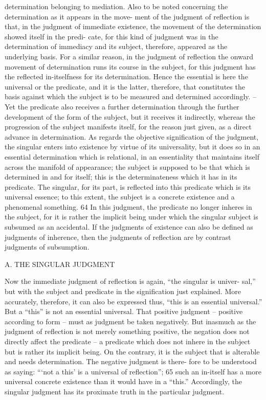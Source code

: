 determination belonging to mediation.
Also to be noted concerning the determination as it appears in the move-
ment of the judgment of reflection is that, in the judgment of immediate
existence, the movement of the determination showed itself in the predi-
cate, for this kind of judgment was in the determination of immediacy and
its subject, therefore, appeared as the underlying basis. For a similar reason,
in the judgment of reflection the onward movement of determination runs
its course in the subject, for this judgment has the reflected in-itselfness for
its determination. Hence the essential is here the universal or the predicate,
and it is the latter, therefore, that constitutes the basis against which the
subject is to be measured and determined accordingly. – Yet the predicate
also receives a further determination through the further development of
the form of the subject, but it receives it indirectly, whereas the progression
of the subject manifests itself, for the reason just given, as a direct advance
in determination.
As regards the objective signification of the judgment, the singular enters
into existence by virtue of its universality, but it does so in an essential
determination which is relational, in an essentiality that maintains itself
across the manifold of appearance; the subject is supposed to be that which
is determined in and for itself; this is the determinateness which it has in its
predicate. The singular, for its part, is reflected into this predicate which is
its universal essence; to this extent, the subject is a concrete existence and a
phenomenal something. 64 In this judgment, the predicate no longer inheres
in the subject, for it is rather the implicit being under which the singular
subject is subsumed as an accidental. If the judgments of existence can also
be defined as judgments of inherence, then the judgments of reflection are
by contrast judgments of subsumption.

A. THE SINGULAR JUDGMENT

Now the immediate judgment of reflection is again, “the singular is univer-
sal,” but with the subject and predicate in the signification just explained.
More accurately, therefore, it can also be expressed thus, “this is an essential
universal.”
But a “this” is not an essential universal. That positive judgment – positive
according to form – must as judgment be taken negatively. But inasmuch
as the judgment of reflection is not merely something positive, the negation
does not directly affect the predicate – a predicate which does not inhere in
the subject but is rather its implicit being. On the contrary, it is the subject
that is alterable and needs determination. The negative judgment is there-
fore to be understood as saying: “‘not a this' is a universal of reflection”; 65
such an in-itself has a more universal concrete existence than it would have
in a “this.” Accordingly, the singular judgment has its proximate truth in
the particular judgment.


